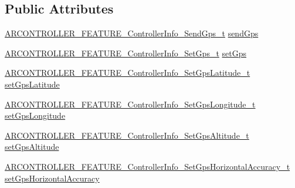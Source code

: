 \subsection*{Public Attributes}
\begin{DoxyCompactItemize}
\item 
\hyperlink{_a_r_c_o_n_t_r_o_l_l_e_r___feature_8h_ac5a2c91a9333ba20b1e46f2bde91d6fa}{A\+R\+C\+O\+N\+T\+R\+O\+L\+L\+E\+R\+\_\+\+F\+E\+A\+T\+U\+R\+E\+\_\+\+Controller\+Info\+\_\+\+Send\+Gps\+\_\+t} \hyperlink{struct_a_r_c_o_n_t_r_o_l_l_e_r___f_e_a_t_u_r_e___controller_info__t_abe225c85ed3f25e2e00fc25bf01e2259}{send\+Gps}
\item 
\hyperlink{_a_r_c_o_n_t_r_o_l_l_e_r___feature_8h_a900a5fc07638160973d1857ae3d6dd7e}{A\+R\+C\+O\+N\+T\+R\+O\+L\+L\+E\+R\+\_\+\+F\+E\+A\+T\+U\+R\+E\+\_\+\+Controller\+Info\+\_\+\+Set\+Gps\+\_\+t} \hyperlink{struct_a_r_c_o_n_t_r_o_l_l_e_r___f_e_a_t_u_r_e___controller_info__t_abbd156bf92c4108cf2f3e244e524f5af}{set\+Gps}
\item 
\hyperlink{_a_r_c_o_n_t_r_o_l_l_e_r___feature_8h_a418ad7e3e89f137aadb8c36168e6fc28}{A\+R\+C\+O\+N\+T\+R\+O\+L\+L\+E\+R\+\_\+\+F\+E\+A\+T\+U\+R\+E\+\_\+\+Controller\+Info\+\_\+\+Set\+Gps\+Latitude\+\_\+t} \hyperlink{struct_a_r_c_o_n_t_r_o_l_l_e_r___f_e_a_t_u_r_e___controller_info__t_a7b36ee1899122df909a7238c48a7d9ec}{set\+Gps\+Latitude}
\item 
\hyperlink{_a_r_c_o_n_t_r_o_l_l_e_r___feature_8h_a73a4b8707651ce70bfbdf145afe8453a}{A\+R\+C\+O\+N\+T\+R\+O\+L\+L\+E\+R\+\_\+\+F\+E\+A\+T\+U\+R\+E\+\_\+\+Controller\+Info\+\_\+\+Set\+Gps\+Longitude\+\_\+t} \hyperlink{struct_a_r_c_o_n_t_r_o_l_l_e_r___f_e_a_t_u_r_e___controller_info__t_adabd3aca7e4a0409a5b26cc6d3fdaf88}{set\+Gps\+Longitude}
\item 
\hyperlink{_a_r_c_o_n_t_r_o_l_l_e_r___feature_8h_a5bb0f68e58c0b237d53d638eedf08da8}{A\+R\+C\+O\+N\+T\+R\+O\+L\+L\+E\+R\+\_\+\+F\+E\+A\+T\+U\+R\+E\+\_\+\+Controller\+Info\+\_\+\+Set\+Gps\+Altitude\+\_\+t} \hyperlink{struct_a_r_c_o_n_t_r_o_l_l_e_r___f_e_a_t_u_r_e___controller_info__t_a1a42bea5592b902edab9760831389efb}{set\+Gps\+Altitude}
\item 
\hyperlink{_a_r_c_o_n_t_r_o_l_l_e_r___feature_8h_a9dbd198415d4e0e885cedaf811cf4b5d}{A\+R\+C\+O\+N\+T\+R\+O\+L\+L\+E\+R\+\_\+\+F\+E\+A\+T\+U\+R\+E\+\_\+\+Controller\+Info\+\_\+\+Set\+Gps\+Horizontal\+Accuracy\+\_\+t} \hyperlink{struct_a_r_c_o_n_t_r_o_l_l_e_r___f_e_a_t_u_r_e___controller_info__t_a1cfac8840ce9b845b9eb4ff08d356ac3}{set\+Gps\+Horizontal\+Accuracy}
\item 

\end{DoxyCompactItemize}
